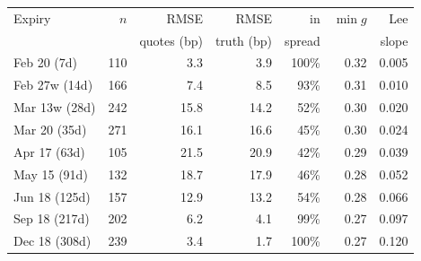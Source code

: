 \begin{tabular}{lrrrrrr}
\toprule
Expiry & $n$ & RMSE & RMSE & in & $\min g$ & Lee \\
 & & quotes (bp) & truth (bp) & spread & & slope \\
\midrule
Feb 20 (7d) & 110 & 3.3 & 3.9 & 100\% & 0.32 & 0.005 \\
Feb 27w (14d) & 166 & 7.4 & 8.5 & 93\% & 0.31 & 0.010 \\
Mar 13w (28d) & 242 & 15.8 & 14.2 & 52\% & 0.30 & 0.020 \\
Mar 20 (35d) & 271 & 16.1 & 16.6 & 45\% & 0.30 & 0.024 \\
Apr 17 (63d) & 105 & 21.5 & 20.9 & 42\% & 0.29 & 0.039 \\
May 15 (91d) & 132 & 18.7 & 17.9 & 46\% & 0.28 & 0.052 \\
Jun 18 (125d) & 157 & 12.9 & 13.2 & 54\% & 0.28 & 0.066 \\
Sep 18 (217d) & 202 & 6.2 & 4.1 & 99\% & 0.27 & 0.097 \\
Dec 18 (308d) & 239 & 3.4 & 1.7 & 100\% & 0.27 & 0.120 \\
\bottomrule
\end{tabular}
